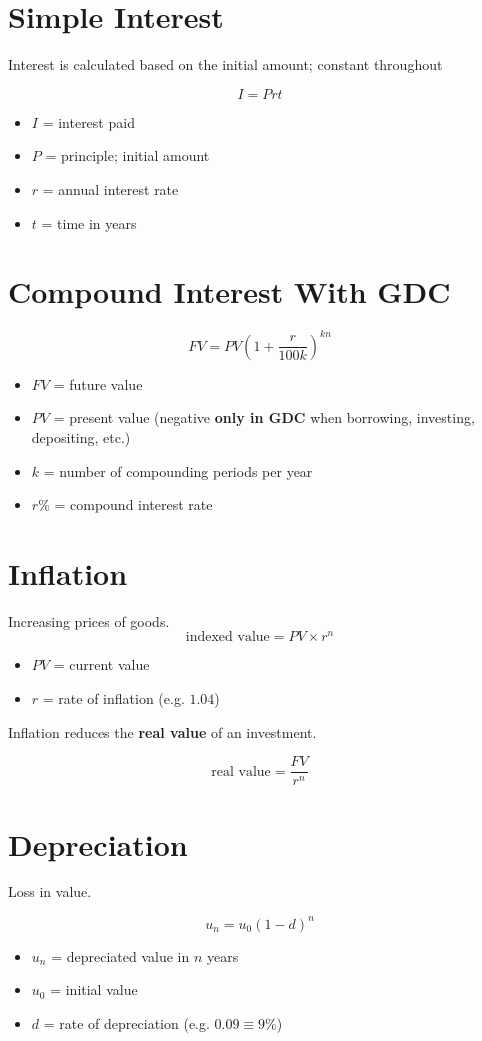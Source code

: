 \documentclass[11pt]{article}
\newcommand{\lb}{\\[8pt]}
\begin{document}
\pagebreak

\section{Simple Interest}

Interest is calculated based on the initial amount; constant throughout

$$I = Prt$$

\begin{itemize}
  \item $I$ = interest paid
  \item $P$ = principle; initial amount
  \item $r$ = annual interest rate
  \item $t$ = time in years
\end{itemize}

\section{Compound Interest With GDC}

$$FV = PV\left(1 + \frac{r}{100k}\right)^{kn}$$

\begin{itemize}
  \item $FV$ = future value
  \item $PV$ = present value (negative \textbf{only in GDC} when borrowing, investing, depositing, etc.)
  \item $k$ = number of compounding periods per year
  \item $r\%$ = compound interest rate
\end{itemize}

\pagebreak

\section{Inflation}

Increasing prices of goods.\lb
$$\text{indexed value} = PV \times r^n$$
\begin{itemize}
  \item $PV$ = current value
  \item $r$ = rate of inflation (e.g. $1.04$)
\end{itemize}
Inflation reduces the \textbf{real value} of an investment.

$$\text{real value} = \frac{FV}{r^n}$$

\section{Depreciation}

Loss in value.

$$u_n = u_0(1 - d)^n$$
\begin{itemize}
  \item $u_n$ = depreciated value in $n$ years
  \item $u_0$ = initial value
  \item $d$ = rate of depreciation (e.g. $0.09 \equiv 9\%$)
\end{itemize}
\end{document}
